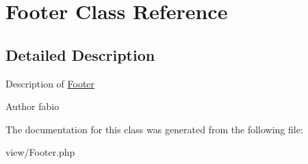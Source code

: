 \hypertarget{classFooter}{\section{Footer Class Reference}
\label{classFooter}
}


\subsection{Detailed Description}
Description of \hyperlink{classFooter}{Footer}

\begin{DoxyAuthor}{Author}
fabio 
\end{DoxyAuthor}


The documentation for this class was generated from the following file\+:\begin{DoxyCompactItemize}
\item 
view/Footer.\+php\end{DoxyCompactItemize}

